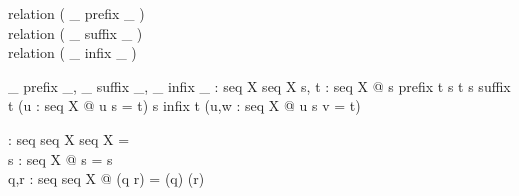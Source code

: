 
\begin{zed}
  relation ( \_ prefix \_ )\\
  relation ( \_ suffix \_ )\\
  relation ( \_ infix \_ )
\end{zed}

\begin{gendef}[X]
  \_ prefix \_,  \_ suffix \_, \_ infix \_ : seq X \rel seq X
\where
  \forall s, t : seq X @
     s prefix t \iff s \subseteq t \land
     s suffix t \iff (\exists u : seq X @ u \cat s = t) \land
     s infix t \iff (\exists u,w : seq X @ u \cat s \cat v = t)
\end{gendef}

\begin{gendef}[X]
  \dcat : seq seq X \fun seq X
\where
  \dcat \langle \rangle = \langle \rangle\\
  \forall s : seq X @ \dcat \langle s \rangle = s\\
  \forall q,r : seq seq X @ \dcat(q \cat r) = (\dcat q) \cat (\dcat r)
\end{gendef}

